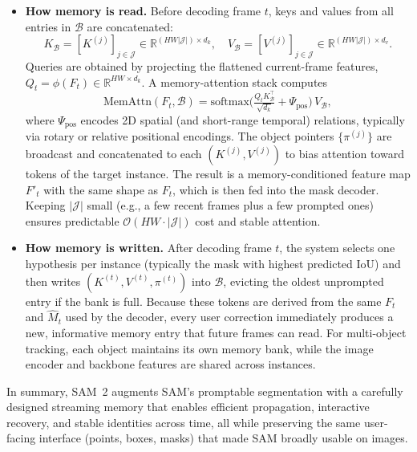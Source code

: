 \begin{enrichment}
\begin{enrichment}
\begin{itemize}
			\item \textbf{How memory is read.} Before decoding frame \(t\), keys and values from all entries in \(\mathcal{B}\) are concatenated:
			\[
			K_{\mathcal{B}} = [K^{(j)}]_{j \in \mathcal{J}} \in \mathbb{R}^{(HW|\mathcal{J}|) \times d_k}, \quad
			V_{\mathcal{B}} = [V^{(j)}]_{j \in \mathcal{J}} \in \mathbb{R}^{(HW|\mathcal{J}|) \times d_v}.
			\]
			Queries are obtained by projecting the flattened current-frame features, \(Q_t = \phi(F_t) \in \mathbb{R}^{HW \times d_k}\). A memory-attention stack computes
			\[
			\text{MemAttn}(F_t,\mathcal{B}) = \text{softmax}\!\Big(\tfrac{Q_t K_{\mathcal{B}}^\top}{\sqrt{d_k}} + \Psi_{\text{pos}}\Big)\, V_{\mathcal{B}},
			\]
			where \(\Psi_{\text{pos}}\) encodes 2D spatial (and short-range temporal) relations, typically via rotary or relative positional encodings. The object pointers \(\{\pi^{(j)}\}\) are broadcast and concatenated to each \((K^{(j)},V^{(j)})\) to bias attention toward tokens of the target instance. The result is a memory-conditioned feature map \(F'_t\) with the same shape as \(F_t\), which is then fed into the mask decoder. Keeping \(|\mathcal{J}|\) small (e.g., a few recent frames plus a few prompted ones) ensures predictable \(\mathcal{O}(HW \cdot |\mathcal{J}|)\) cost and stable attention.
			
			\item \textbf{How memory is written.} After decoding frame \(t\), the system selects one hypothesis per instance (typically the mask with highest predicted IoU) and then writes \((K^{(t)},V^{(t)},\pi^{(t)})\) into \(\mathcal{B}\), evicting the oldest unprompted entry if the bank is full. Because these tokens are derived from the same \(F_t\) and \(\hat{M}_t\) used by the decoder, every user correction immediately produces a new, informative memory entry that future frames can read. For multi-object tracking, each object maintains its own memory bank, while the image encoder and backbone features are shared across instances.
		\end{itemize}
		
		\noindent In summary, SAM~2 augments SAM’s promptable segmentation with a carefully designed streaming memory that enables efficient propagation, interactive recovery, and stable identities across time, all while preserving the same user-facing interface (points, boxes, masks) that made SAM broadly usable on images.
		

\end{enrichment}
\end{enrichment}

